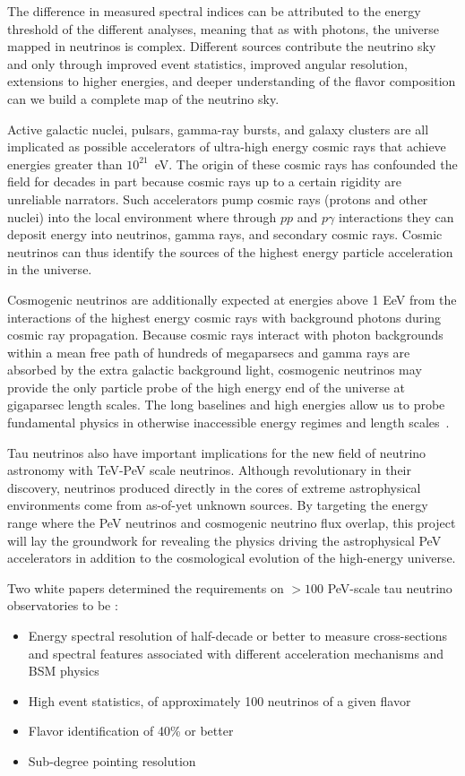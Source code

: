 \documentclass[12pt]{article}
\begin{document}
The difference in measured spectral indices can be attributed to the energy threshold of the different analyses, meaning that as with photons, the universe mapped in neutrinos is complex. Different sources contribute the neutrino sky and only through improved event statistics, improved angular resolution, extensions to higher energies, and deeper understanding of the flavor composition can we build a complete map of the neutrino sky. 


Active galactic nuclei, pulsars, gamma-ray bursts, and galaxy clusters are all implicated as possible accelerators of ultra-high energy cosmic rays that achieve energies greater than $10^{21}$~eV. The origin of these cosmic rays has confounded the field for decades in part because cosmic rays up to a certain rigidity are unreliable narrators. Such accelerators pump cosmic rays (protons and other nuclei) into the local environment where through $pp$ and $p\gamma$ interactions they can deposit energy into neutrinos, gamma rays, and secondary cosmic rays. Cosmic neutrinos can thus identify the sources of the highest energy particle acceleration in the universe.


Cosmogenic neutrinos are additionally expected at energies above 1 EeV from the interactions of the highest energy cosmic rays with background photons during cosmic ray propagation. Because cosmic rays interact with photon backgrounds within a mean free path of hundreds of megaparsecs and gamma rays are absorbed by the extra galactic background light, cosmogenic neutrinos may provide the only particle probe of the high energy end of the universe at gigaparsec length scales. The long baselines and high energies allow us to probe fundamental physics in otherwise inaccessible energy regimes and length scales~\cite{astro2020_fundamental}.

Tau neutrinos also have important implications for the new field of neutrino astronomy with TeV-PeV scale neutrinos. Although revolutionary in their discovery, neutrinos produced directly in the cores of extreme astrophysical environments come from as-of-yet unknown sources. By targeting the energy range where the PeV neutrinos and cosmogenic neutrino flux overlap, this project will lay the groundwork for revealing the physics driving the astrophysical PeV accelerators in addition to the cosmological evolution of the high-energy universe.
	
Two white papers determined the requirements on $>100$ PeV-scale tau neutrino observatories to be \cite{Astro2020_fundamental, Astro2020_astrophysics}:
\begin{itemize}
	\item Energy spectral resolution of half-decade or better to measure cross-sections and spectral features associated with different acceleration mechanisms and BSM physics
	\item High event statistics, of approximately 100 neutrinos of a given flavor
	\item Flavor identification of 40\% or better
	\item Sub-degree pointing resolution
\end{itemize}
\end{document}
